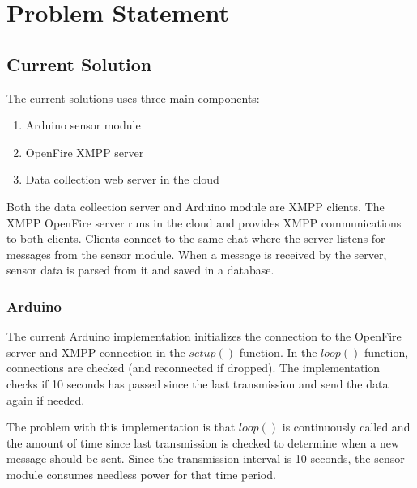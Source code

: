 
\chapter{Problem Statement} %



\ifpdf
    \graphicspath{{X/figures/PNG/}{X/figures/PDF/}{X/figures/}}
\else
    \graphicspath{{X/figures/EPS/}{X/figures/}}
\fi


\section{Current Solution}

The current solutions uses three main components:
\begin{enumerate}
\item Arduino sensor module
\item OpenFire XMPP server
\item Data collection web server in the cloud
\end{enumerate}

Both the data collection server and Arduino module are XMPP clients. The XMPP OpenFire server runs in the cloud and provides XMPP communications to both clients. Clients connect to the same chat where the server listens for messages from the sensor module. When a message is received by the server, sensor data is parsed from it and saved in a database.

\subsection{Arduino}

The current Arduino implementation initializes the connection to the OpenFire server and XMPP connection in the $setup()$ function. In the $loop()$ function, connections are checked (and reconnected if dropped). The implementation checks if 10 seconds has passed since the last transmission and send the data again if needed.

The problem with this implementation is that $loop()$ is continuously called and the amount of time since last transmission is checked to determine when a new message should be sent. Since the transmission interval is 10 seconds, the sensor module consumes needless power for that time period. 

